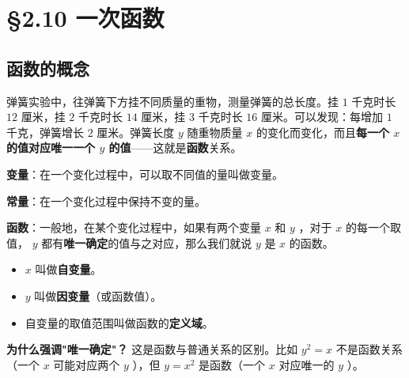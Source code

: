 \chapter{§2.10 一次函数}
\label{sec:2.10}





\section*{函数的概念}


\begin{explore}


弹簧实验中，往弹簧下方挂不同质量的重物，测量弹簧的总长度。挂 $1$ 千克时长 $12$ 厘米，挂 $2$ 千克时长 $14$ 厘米，挂 $3$ 千克时长 $16$ 厘米。可以发现：每增加 $1$ 千克，弹簧增长 $2$ 厘米。弹簧长度 $y$ 随重物质量 $x$ 的变化而变化，而且\textbf{每一个 $x$ 的值对应唯一一个 $y$ 的值}——这就是\textbf{函数}关系。

\end{explore}

\begin{understand}


\textbf{变量}：在一个变化过程中，可以取不同值的量叫做变量。

\textbf{常量}：在一个变化过程中保持不变的量。

\textbf{函数}：一般地，在某个变化过程中，如果有两个变量 $x$ 和 $y$ ，对于 $x$ 的每一个取值， $y$ 都有\textbf{唯一确定}的值与之对应，那么我们就说 $y$ 是 $x$ 的函数。

\begin{itemize}
  \item $x$ 叫做\textbf{自变量}。
  \item $y$ 叫做\textbf{因变量}（或函数值）。
  \item 自变量的取值范围叫做函数的\textbf{定义域}。
\end{itemize}


\textbf{为什么强调"唯一确定"？} 这是函数与普通关系的区别。比如 $y^2 = x$ 不是函数关系（一个 $x$ 可能对应两个 $y$ ），但 $y = x^2$ 是函数（一个 $x$ 对应唯一的 $y$ ）。

\end{understand}

